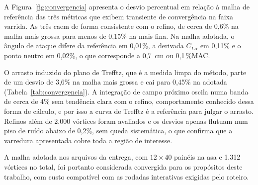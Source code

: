 A Figura~\ref{fig:convergencia} apresenta o desvio percentual em relação à
malha de referência das três métricas que exibem transiente de convergência
na faixa varrida. As três caem de forma consistente com o refino, de cerca
de 0,6\% na malha mais grossa para menos de 0,15\% na mais fina. Na malha
adotada, o ângulo de ataque difere da referência em 0,01\%, a derivada
$C_{L\alpha}$ em 0,11\% e o ponto neutro em 0,02\%, o que corresponde a
0,7~cm ou 0,1\,\%MAC.

O arrasto induzido do plano de Trefftz, que é a medida limpa do método,
parte de um desvio de 3,6\% na malha mais grossa e cai para 0,45\% na
adotada (Tabela~\ref{tab:convergencia}). A integração de campo próximo
oscila numa banda de cerca de 4\% sem tendência clara com o refino,
comportamento conhecido dessa forma de cálculo, e por isso a curva de
Trefftz é a referência para julgar o arrasto. Refinos além de 2.000
vórtices foram avaliados e os desvios apenas flutuam num piso de ruído
abaixo de 0,2\%, sem queda sistemática, o que confirma que a varredura
apresentada cobre toda a região de interesse.

A malha adotada nos arquivos da entrega, com $12\times 40$ painéis na asa e
1.312 vórtices no total, foi portanto considerada convergida para os
propósitos deste trabalho, com custo compatível com as rodadas interativas
exigidas pelo roteiro.
